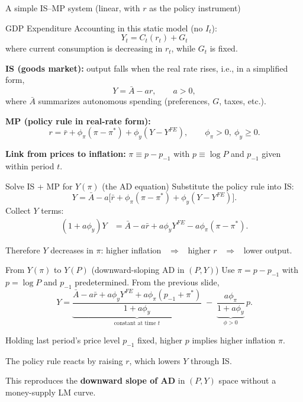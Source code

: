 \documentclass[aspectratio=169,xcolor=dvipsnames]{beamer}
\let\tempone\itemize
\let\temptwo\enditemize
\renewenvironment{itemize}{\tempone\addtolength{\itemsep}{\fill}}{\temptwo}
\begin{document}
\begin{frame}{A simple IS--MP system (linear, with $r$ as the policy instrument)}
\small
\begin{itemize}
\item GDP Expenditure Accounting in this static model (no $I_{t}$):
\[
    Y_{t} = C_{t}(r_{t}) + G_{t}
\]
where current consumption is decreasing in $ r_{t} $, while $ G_{t} $ is fixed.
\item \textbf{IS (goods market):} output falls when the real rate rises, i.e., in a simplified form,
\[
Y = \bar{A} - a r,\qquad a>0,
\]
where $\bar{A}$ summarizes autonomous spending (preferences, $G$, taxes, etc.).
\item \textbf{MP (policy rule in real-rate form):}
\[
r = \bar{r} + \phi_{\pi}(\pi-\pi^{\ast}) + \phi_{y}(Y-Y^{FE}),
\qquad \phi_{\pi}>0,\ \phi_{y}\ge 0.
\]
\item \textbf{Link from prices to inflation:} $\pi \equiv p-p_{-1}$ with $p\equiv \log P$ and $p_{-1}$ given within period $t$.
\end{itemize}
\end{frame}

\begin{frame}{Solve IS + MP for $Y(\pi)$ (the AD equation)}
\small
Substitute the policy rule into IS:
\[
Y = \bar{A} - a\Big[\bar{r} + \phi_{\pi}(\pi-\pi^{\ast}) + \phi_{y}(Y-Y^{FE})\Big].
\]
Collect $Y$ terms:
\begin{align*}
(1+a\phi_{y})Y
&= \bar{A} - a\bar{r} + a\phi_{y}Y^{FE} - a\phi_{\pi}(\pi-\pi^{\ast}).
\end{align*}

\vspace{0.3em}
\begin{itemize}
\item Therefore $Y$ decreases in $\pi$: higher inflation \ $\Rightarrow$ \ higher $r$ \ $\Rightarrow$ \ lower output.
\end{itemize}
\end{frame}

\begin{frame}{From $Y(\pi)$ to $Y(P)$ (downward-sloping AD in $(P,Y)$)}
\small
Use $\pi = p-p_{-1}$ with $p=\log P$ and $p_{-1}$ predetermined.
From the previous slide,
\[
Y
=
\underbrace{\frac{\bar{A} - a\bar{r} + a\phi_{y}Y^{FE} + a\phi_{\pi}(p_{-1}+\pi^{\ast})}{1+a\phi_{y}}}_{\text{constant at time }t}
\;-\;\underbrace{\frac{a\phi_{\pi}}{1+a\phi_{y}}}_{\phi>0}\,p.
\]

\vspace{0.3em}
\begin{itemize}
\item Holding last period's price level $p_{-1}$ fixed, higher $p$ implies higher inflation $\pi$.
\item The policy rule reacts by raising $r$, which lowers $Y$ through IS.
\item This reproduces the \textbf{downward slope of AD} in $(P,Y)$ space without a money-supply LM curve.
\end{itemize}
\end{frame}
\end{document}
